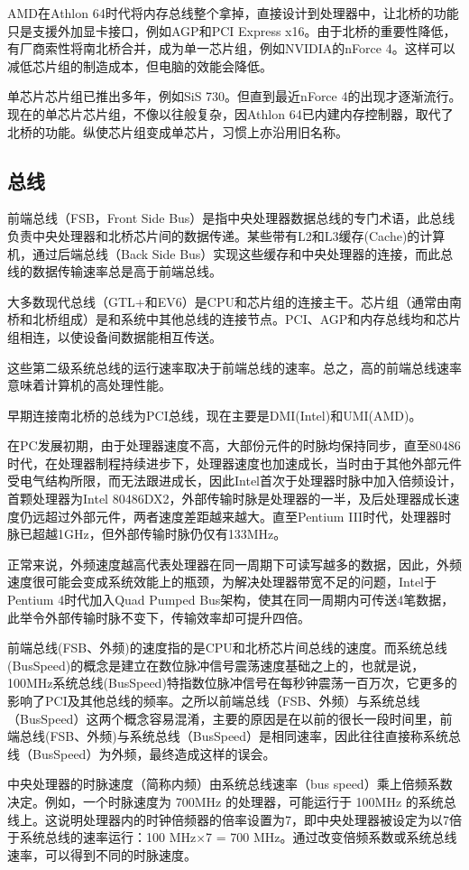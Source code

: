 AMD在Athlon 64时代将内存总线整个拿掉，直接设计到处理器中，让北桥的功能只是支援外加显卡接口，例如AGP和PCI Express x16。由于北桥的重要性降低，有厂商索性将南北桥合并，成为单一芯片组，例如NVIDIA的nForce 4。这样可以减低芯片组的制造成本，但电脑的效能会降低。

单芯片芯片组已推出多年，例如SiS 730。但直到最近nForce 4的出现才逐渐流行。现在的单芯片芯片组，不像以往般复杂，因Athlon 64已内建内存控制器，取代了北桥的功能。纵使芯片组变成单芯片，习惯上亦沿用旧名称。

\subsection{总线}

前端总线（FSB，Front Side Bus）是指中央处理器数据总线的专门术语，此总线负责中央处理器和北桥芯片间的数据传递。某些带有L2和L3缓存(Cache)的计算机，通过后端总线（Back Side Bus）实现这些缓存和中央处理器的连接，而此总线的数据传输速率总是高于前端总线。

大多数现代总线（GTL+和EV6）是CPU和芯片组的连接主干。芯片组（通常由南桥和北桥组成）是和系统中其他总线的连接节点。PCI、AGP和内存总线均和芯片组相连，以使设备间数据能相互传送。

这些第二级系统总线的运行速率取决于前端总线的速率。总之，高的前端总线速率意味着计算机的高处理性能。

早期连接南北桥的总线为PCI总线，现在主要是DMI(Intel)和UMI(AMD)。

在PC发展初期，由于处理器速度不高，大部份元件的时脉均保持同步，直至80486时代，在处理器制程持续进步下，处理器速度也加速成长，当时由于其他外部元件受电气结构所限，而无法跟进成长，因此Intel首次于处理器时脉中加入倍频设计，首颗处理器为Intel 80486DX2，外部传输时脉是处理器的一半，及后处理器成长速度仍远超过外部元件，两者速度差距越来越大。直至Pentium III时代，处理器时脉已超越1GHz，但外部传输时脉仍仅有133MHz。

正常来说，外频速度越高代表处理器在同一周期下可读写越多的数据，因此，外频速度很可能会变成系统效能上的瓶颈，为解决处理器带宽不足的问题，Intel于Pentium 4时代加入Quad Pumped Bus架构，使其在同一周期内可传送4笔数据，此举令外部传输时脉不变下，传输效率却可提升四倍。

前端总线(FSB、外频)的速度指的是CPU和北桥芯片间总线的速度。而系统总线(BusSpeed)的概念是建立在数位脉冲信号震荡速度基础之上的，也就是说，100MHz系统总线(BusSpeed)特指数位脉冲信号在每秒钟震荡一百万次，它更多的影响了PCI及其他总线的频率。之所以前端总线（FSB、外频）与系统总线（BusSpeed）这两个概念容易混淆，主要的原因是在以前的很长一段时间里，前端总线(FSB、外频)与系统总线（BusSpeed）是相同速率，因此往往直接称系统总线（BusSpeed）为外频，最终造成这样的误会。

中央处理器的时脉速度（简称内频）由系统总线速率（bus speed）乘上倍频系数决定。例如，一个时脉速度为 700MHz 的处理器，可能运行于 100MHz 的系统总线上。这说明处理器内的时钟倍频器的倍率设置为7，即中央处理器被设定为以7倍于系统总线的速率运行：100 MHz×7 = 700 MHz。通过改变倍频系数或系统总线速率，可以得到不同的时脉速度。














